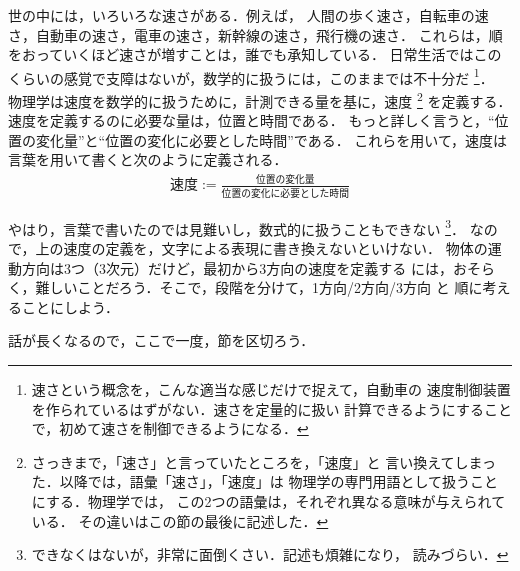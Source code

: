             世の中には，いろいろな速さがある．例えば，
            人間の歩く速さ，自転車の速さ，自動車の速さ，電車の速さ，新幹線の速さ，飛行機の速さ．
            これらは，順をおっていくほど速さが増すことは，誰でも承知している．
            日常生活ではこのくらいの感覚で支障はないが，数学的に扱うには，このままでは不十分だ
                \footnote{
                    速さという概念を，こんな適当な感じだけで捉えて，自動車の
                    速度制御装置を作られているはずがない．速さを定量的に扱い
                    計算できるようにすることで，初めて速さを制御できるようになる．
                }．
            物理学は速度を数学的に扱うために，計測できる量を基に，速度
                \footnote{
                    さっきまで，「速さ」と言っていたところを，「速度」と
                    言い換えてしまった．以降では，語彙「速さ」，「速度」は
                    物理学の専門用語として扱うことにする．物理学では，
                    この2つの語彙は，それぞれ異なる意味が与えられている．
                    その違いはこの節の最後に記述した．
                }
            を定義する．速度を定義するのに必要な量は，位置と時間である．
            もっと詳しく言うと，“位置の変化量”と“位置の変化に必要とした時間”である．
            これらを用いて，速度は言葉を用いて書くと次のように定義される．
                \begin{align}
                    \mbox{速度} := \frac{\mbox{位置の変化量}}
                                       {\mbox{位置の変化に必要とした時間}}
                \end{align}

            やはり，言葉で書いたのでは見難いし，数式的に扱うこともできない
                \footnote{
                    できなくはないが，非常に面倒くさい．記述も煩雑になり，
                    読みづらい．
                }．
            なので，上の速度の定義を，文字による表現に書き換えないといけない．
            物体の運動方向は3つ（3次元）だけど，最初から3方向の速度を定義する
            には，おそらく，難しいことだろう．そこで，段階を分けて，1方向/2方向/3方向 と
            順に考えることにしよう．

            話が長くなるので，ここで一度，節を区切ろう．

